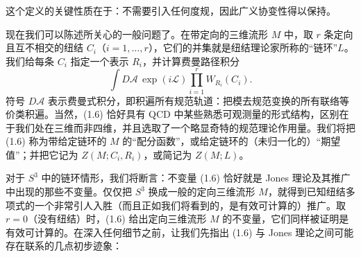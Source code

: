 \documentclass[11pt,a4paper]{article}
\DeclareMathOperator{\Tr}{Tr}
\begin{document}
这个定义的关键性质在于：不需要引入任何度规，因此广义协变性得以保持。


现在我们可以陈述所关心的一般问题了。在带定向的三维流形 $M$ 中，取 $r$ 条定向且互不相交的纽结 $C_i$（$i=1,\dots,r$），它们的并集就是纽结理论家所称的“链环”$L$。我们给每条 $C_i$ 指定一个表示 $R_i$，并计算费曼路径积分
\begin{equation}
    \int D\mathcal{A}\,\exp(i\mathcal{L})\prod_{i=1}^{r}W_{R_i}(C_i).
    \tag{1.6}
\end{equation}
符号 $D\mathcal{A}$ 表示费曼式积分，即积遍所有规范轨道：把模去规范变换的所有联络等价类积遍。当然，(1.6) 恰好具有 QCD 中某些熟悉可观测量的形式结构，区别在于我们处在三维而非四维，并且选取了一个略显奇特的规范理论作用量。我们将把 (1.6) 称为带给定链环的 $M$ 的“配分函数”，或给定链环的（未归一化的）“期望值”；并把它记为 $Z(M;C_i,R_i)$，或简记为 $Z(M;L)$。


对于 $S^3$ 中的链环情形，我们将断言：不变量 (1.6) 恰好就是 Jones 理论及其推广中出现的那些不变量。仅仅把 $S^3$ 换成一般的定向三维流形 $M$，就得到已知纽结多项式的一个非常引人入胜（而且正如我们将看到的，是有效可计算的）推广。取 $r=0$（没有纽结）时，(1.6) 给出定向三维流形 $M$ 的不变量，它们同样被证明是有效可计算的。在深入任何细节之前，让我们先指出 (1.6) 与 Jones 理论之间可能存在联系的几点初步迹象：
\end{document}
